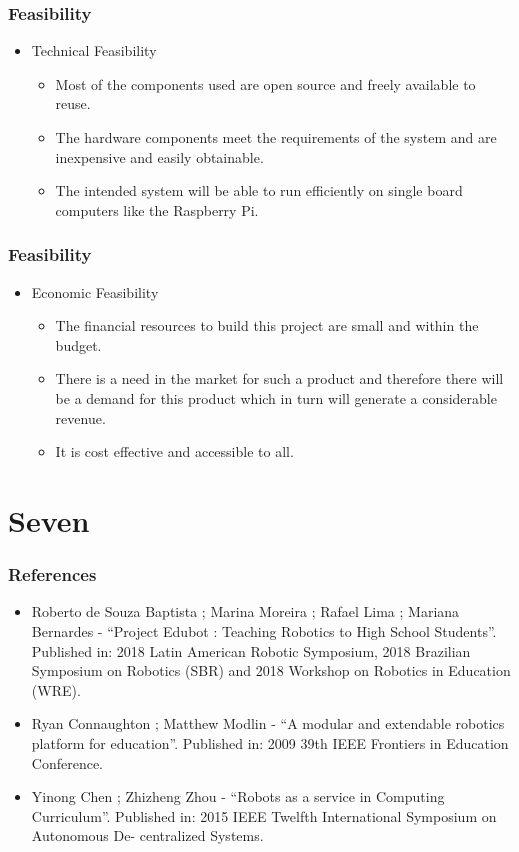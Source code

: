 \documentclass{beamer}
\begin{document}
\begin{frame}
\frametitle{Feasibility}
\begin{center}
\justifying
\begin{itemize}
\item Technical Feasibility
\begin{itemize}
\item Most of the components used are open source and freely available to reuse.
\item The hardware components meet the requirements of the system and are inexpensive and easily obtainable.
\item The intended system will be able to run efficiently on single board computers like the Raspberry Pi.
\end{itemize}
\end{itemize}
\end{center}
\end{frame} 

\begin{frame}
\frametitle{Feasibility}
\begin{center}
\justifying
\begin{itemize}
\item Economic Feasibility
\begin{itemize}
\item The financial resources to build this project are small and within the budget.
\item There is a need in the market for such a product and therefore there will be a demand for this product which in turn will generate a considerable revenue.
\item It is cost effective and accessible to all.
\end{itemize}
\end{itemize}
\end{center}
\end{frame} 

\section{Seven}
\begin{frame}
\frametitle{References}
\begin{center}
\justifying
\begin{itemize}
\item Roberto de Souza Baptista ; Marina Moreira ; Rafael Lima ; Mariana Bernardes - “Project Edubot : Teaching Robotics to High School Students”. Published in: 2018 Latin American Robotic Symposium, 2018 Brazilian Symposium on Robotics (SBR) and 2018 Workshop on Robotics in Education (WRE).
\item Ryan Connaughton ; Matthew Modlin - “A modular and extendable robotics platform for education”. Published in: 2009 39th IEEE Frontiers in Education Conference.
\item Yinong Chen ; Zhizheng Zhou - “Robots as a service in Computing Curriculum”. Published in: 2015 IEEE Twelfth International Symposium on Autonomous De- centralized Systems.
\end{itemize}
\end{center}
\end{frame} 
\end{document}

